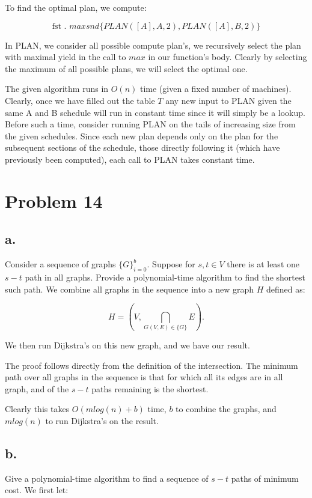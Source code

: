\documentclass{amsart}
\theoremstyle{definition}
\theoremstyle{remark}
\numberwithin{equation}{section}
\begin{document}
To find the optimal plan, we compute:

$$ \text{fst . }maxsnd \{ PLAN([A],A, 2), PLAN([A],B, 2) \} $$

In PLAN, we consider all possible compute plan's, we recursively select the plan with maximal yield in the call to $max$ in our function's body. Clearly by selecting the maximum of all possible plans, we will select the optimal one.


\claimstar The given algorithm runs in $O(n)$ time (given a fixed number of machines).
Clearly, once we have filled out the table $T$ any new input to PLAN given the same A and B schedule will run in constant time since it will simply be a lookup. Before such a time, consider running PLAN on the tails of increasing size from the given schedules. Since each new plan depends only on the plan for the subsequent sections of the schedule, those directly following it (which have previously been computed), each call to PLAN takes constant time.




\section{Problem 14}
\subsection*{a.}
Consider a sequence of graphs $\{G\}_{i=0}^b$. Suppose for $s,t \in V$ there is at least one $s-t$ path in all graphs. Provide a polynomial-time algorithm to find the shortest such path.
\algstar
We combine all graphs in the sequence into a new graph $H$ defined as:

$$ H = \left( V, \bigcap_{G(V,E) \in \{G\}} E \right). $$

We then run Dijkstra's on this new graph, and we have our result.

\proof
The proof follows directly from the definition of the intersection. The minimum path over all graphs in the sequence is that for which all its edges are in all graph, and of the $s-t$ paths remaining is the shortest.

Clearly this takes $O(mlog(n)+b)$ time, $b$ to combine the graphs, and $mlog(n)$ to run Dijkstra's on the result.

\subsection*{b.}
Give a polynomial-time algorithm to find a sequence of $s-t$ paths of minimum cost. We first let:
\end{document}
